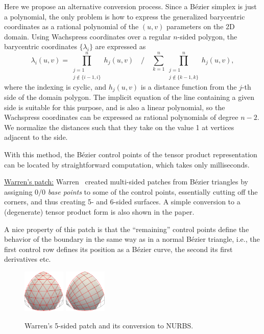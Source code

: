 \documentclass{article}
\begin{document}
Here we propose an alternative conversion process. Since a B\'ezier simplex is just a polynomial,
the only problem is how to express the generalized barycentric coordinates as a rational polynomial
of the $(u,v)$ parameters on the 2D domain. Using Wachspress coordinates over a regular $n$-sided
polygon, the barycentric coordinates $\{\lambda_i\}$ are expressed as
\begin{equation}
  \label{eq:wachspress}
  \lambda_i(u,v) = \prod_{\substack{j=1\\j\notin\{i-1,i\}}}^nh_j(u,v) \quad\bigg/\quad
                   \sum_{k=1}^n\prod_{\substack{j=1\\j\notin\{k-1,k\}}}^nh_j(u,v),
\end{equation}
where the indexing is cyclic, and $h_j(u,v)$ is a distance function
from the $j$-th side of the domain polygon. The implicit
equation of the line containing a given side is suitable for this purpose,
and is also a linear polynomial,
so the Wachspress coordinates can be expressed as rational polynomials of degree $n-2$. We
normalize the distances such that they take on the value 1 at vertices adjacent to the side.

With this method, the B\'ezier control points of the tensor product representation
can be located by straightforward computation, which takes only milliseconds.

\vspace{10pt}
\noindent\underline{Warren's patch:}\vspace{0.2em}\newline
Warren~\cite{warren} created multi-sided patches from B\'ezier triangles by assigning $0/0$
\emph{base points} to some of the control points, essentially cutting off the corners, and thus
creating 5- and 6-sided surfaces. A simple conversion to a (degenerate) tensor product form is
also shown in the paper.

A nice property of this patch is that the ``remaining'' control points define the behavior of the
boundary in the same way as in a normal B\'ezier triangle, i.e., the first control row defines
its position as a B\'ezier curve, the second its first derivatives etc.
\begin{figure}[h!]
  \centering
  \includegraphics[width = 0.18\textwidth]{images/warren-cnet.png}
  \hspace{3cm}
  \includegraphics[width = 0.18\textwidth]{images/warren-quad.png}
  \caption{Warren's 5-sided patch and its conversion to NURBS.}
\end{figure}
\end{document}
